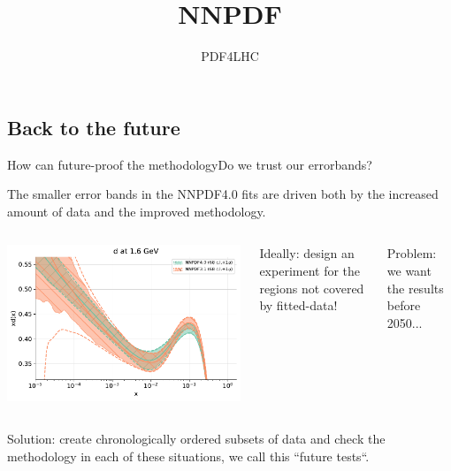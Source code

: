 \newcommand{\hlme}[1]{{\color{red}\bf #1}}
\renewcommand{\figurename}{\tiny Fig.}

\title{NNPDF}
\author[Juan Cruz-Martinez]{}
\date{PDF4LHC}

\subsection{Back to the future}

\begin{frame}{How can future-proof the methodology}{Do we trust our errorbands?}

    \small
    The smaller error bands in the NNPDF4.0 fits are driven both by the increased amount of data and the
    improved methodology.

    \begin{columns}
        \includegraphics[width=1.0\textwidth]{juan_future_hyperopt/dquark.pdf}

         \vspace{-1.6cm} {

            Ideally: design an experiment for the regions not covered by fitted-data!

            \vspace{0.3cm}

            Problem: we want the results before 2050...

        }
    \end{columns}

    \vspace{-0.8cm}

    \begin{columns}
        Solution: create chronologically ordered subsets of data and check the methodology in each of
        these situations, we call this ``future tests``.


\end{columns}
\end{frame}
